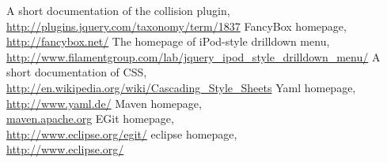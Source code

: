 \begin{thebibliography}{999}
         A short documentation of the collision plugin, \\
         \url{http://plugins.jquery.com/taxonomy/term/1837}
         FancyBox homepage, \\
         \url{http://fancybox.net/}
         The homepage of iPod-style drilldown menu, \\
         \url{http://www.filamentgroup.com/lab/jquery_ipod_style_drilldown_menu/}
         A short documentation of CSS, \\
         \url{http://en.wikipedia.org/wiki/Cascading_Style_Sheets}
         Yaml homepage, \\
         \url{http://www.yaml.de/}
         Maven homepage, \\
         \url{maven.apache.org}
         EGit homepage, \\
         \url{http://www.eclipse.org/egit/}
         eclipse homepage, \\
         \url{http://www.eclipse.org/}
	\end{thebibliography}

